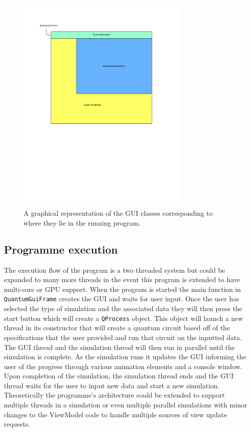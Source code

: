 \documentclass[bibliography=totocnumbered, 10pt]{article}
\theoremstyle{NoticeStyle}
\begin{document}
\begin{figure}[H]
	\centering
	\includegraphics[width=0.75\textwidth]{img/GuiDiagram.pdf}
	\caption{A graphical representation of the GUI classes corresponding to where they lie in the running program.}
\end{figure}

\subsection{Programme execution}
The execution flow of the program is a two threaded system but could be expanded to many more threads in the event this program is extended to have multi-core or GPU support. When the program is started the main function in \texttt{QuantumGuiFrame} creates the GUI and waits for user input.  Once the user has selected the type of simulation and the associated data they will then press the start button which will create a \texttt{QProcess} object.  This object will launch a new thread in its constructor that will create a quantum circuit based off of the specifications that the user provided and run that circuit on the inputted data. The GUI thread and the simulation thread will then run in parallel until the simulation is complete. As the simulation runs it updates the GUI informing the user of the progress through various animation elements and a console window. Upon completion of the simulation, the simulation thread ends and the GUI thread waits for the user to input new data
and start a new simulation. Theoretically the programme's architecture could be extended to support multiple threads in a simulation or even multiple parallel simulations with minor changes to the ViewModel code to handle multiple sources of view update requests.
\end{document}
